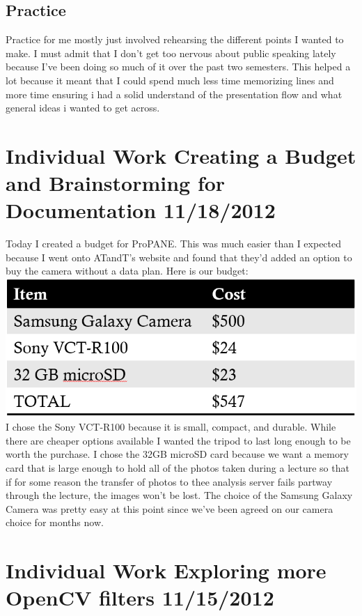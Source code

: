 \documentclass[]{article}
\begin{document}
		\subsection{Practice}
			Practice for me mostly just involved rehearsing the different points I wanted to make. I must admit that I don't get too nervous about public speaking lately because I've been doing so much of it over the past two semesters. This helped a lot because it meant that I could spend much less time memorizing lines and more time ensuring i had a solid understand of the presentation flow and what general ideas i wanted to get across.
		
	
	\section{Individual Work Creating a Budget and Brainstorming for Documentation 11/18/2012}
	
	Today I created a budget for ProPANE. This was much easier than I expected because I went onto ATandT's website and found that they'd added an option to buy the camera without a data plan. Here is our budget: \\
	
		\includegraphics[scale=0.5]{images/budget.png} \\
		
		I chose the Sony VCT-R100 because it is small, compact, and durable. While there are cheaper options available I wanted the tripod to last long enough to be worth the purchase.
		I chose the 32GB microSD card because we want a memory card that is large enough to hold all of the photos taken during a lecture so that if for some reason the transfer of photos to thee analysis server fails partway through the lecture, the images won't be lost.
		The choice of the Samsung Galaxy Camera was pretty easy at this point since we've been agreed on our camera choice for months now.
	
	\section{Individual Work Exploring more OpenCV filters 11/15/2012}	
	
\end{document}
